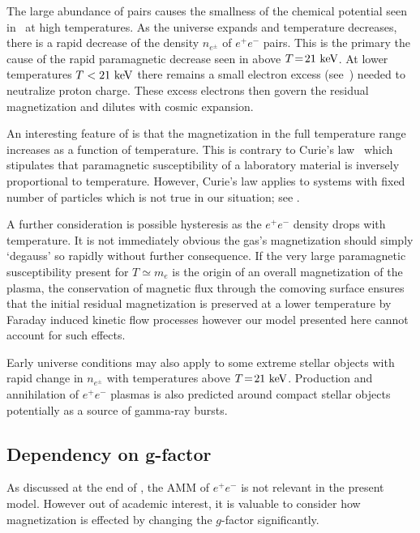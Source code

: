 The large abundance of pairs causes the smallness of the chemical potential seen in~ at high temperatures. As the universe expands and temperature decreases, there is a rapid decrease of the density $n_{e^{\pm}}$ of $e^{+}e^{-}$ pairs. This is the primary the cause of the rapid paramagnetic decrease seen in  above $T\!=\!21\text{ keV}$. At lower temperatures $T<21\text{ keV}$ there remains a small electron excess (see~) needed to neutralize proton charge. These excess electrons then govern the residual magnetization and dilutes with cosmic expansion.

An interesting feature of  is that the magnetization in the full temperature range increases as a function of temperature. This is contrary to Curie's law~\citep{greiner2012thermodynamics} which stipulates that paramagnetic susceptibility of a laboratory material is inversely proportional to temperature. However, Curie's law applies to systems with fixed number of particles which is not true in our situation; see .

A further consideration is possible hysteresis as the $e^{+}e^{-}$ density drops with temperature. It is not immediately obvious the gas's magnetization should simply `degauss' so rapidly without further consequence. If the very large paramagnetic susceptibility present for $T\simeq m_{e}$ is the origin of an overall magnetization of the plasma, the conservation of magnetic flux through the comoving surface ensures that the initial residual magnetization is preserved at a lower temperature by Faraday induced kinetic flow processes however our model presented here cannot account for such effects.

Early universe conditions may also apply to some extreme stellar objects with rapid change in $n_{e^{\pm}}$ with temperatures above $T\!=\!21\text{ keV}$. Production and annihilation of $e^{+}e^{-}$ plasmas is also predicted around compact stellar objects~\citep{Ruffini:2009hg,Ruffini:2012it} potentially as a source of gamma-ray bursts.

\subsection{Dependency on g-factor}
\label{sec:gfac}

\noindent As discussed at the end of , the AMM of $e^{+}e^{-}$ is not relevant in the present model. However out of academic interest, it is valuable to consider how magnetization is effected by changing the $g$-factor significantly.

